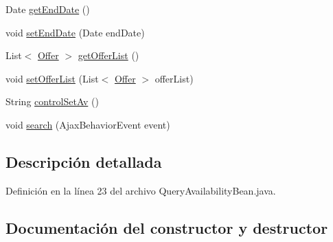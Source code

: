 \begin{DoxyCompactItemize}
\item 
Date \mbox{\hyperlink{classcom_1_1ruralhousejsf_1_1model_1_1availability_1_1_query_availability_bean_ad88c5dd8af5a7bfd0cccd39b0ce380df}{get\+End\+Date}} ()
\item 
void \mbox{\hyperlink{classcom_1_1ruralhousejsf_1_1model_1_1availability_1_1_query_availability_bean_a3610ce95ad8c1adad2e4405557953d40}{set\+End\+Date}} (Date end\+Date)
\item 
List$<$ \mbox{\hyperlink{classcom_1_1ruralhousejsf_1_1domain_1_1_offer}{Offer}} $>$ \mbox{\hyperlink{classcom_1_1ruralhousejsf_1_1model_1_1availability_1_1_query_availability_bean_ad9667676a26fe3df951a287607f14581}{get\+Offer\+List}} ()
\item 
void \mbox{\hyperlink{classcom_1_1ruralhousejsf_1_1model_1_1availability_1_1_query_availability_bean_a0a1948b5e5b3b7c6028a61d194429b0d}{set\+Offer\+List}} (List$<$ \mbox{\hyperlink{classcom_1_1ruralhousejsf_1_1domain_1_1_offer}{Offer}} $>$ offer\+List)
\item 
String \mbox{\hyperlink{classcom_1_1ruralhousejsf_1_1model_1_1availability_1_1_query_availability_bean_a1a498adf03c6caab6eb80a2da7483b50}{control\+Set\+Av}} ()
\item 
void \mbox{\hyperlink{classcom_1_1ruralhousejsf_1_1model_1_1availability_1_1_query_availability_bean_af7649b8dfb405d8faf95e00125b3efc3}{search}} (Ajax\+Behavior\+Event event)
\end{DoxyCompactItemize}


\subsection{Descripción detallada}


Definición en la línea 23 del archivo Query\+Availability\+Bean.\+java.



\subsection{Documentación del constructor y destructor}
\mbox{\label{classcom_1_1ruralhousejsf_1_1model_1_1availability_1_1_query_availability_bean_a774769b2abae9a936441fcb0221f3cde}} 
